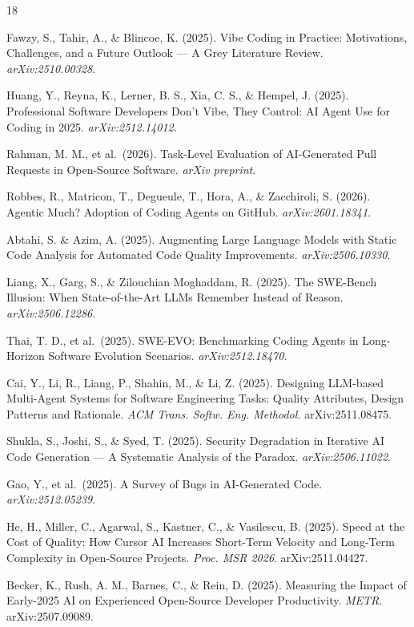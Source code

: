 \documentclass[11pt,a4paper]{article}
\begin{document}
\begin{thebibliography}{18}

 Fawzy, S., Tahir, A., \& Blincoe, K. (2025). Vibe Coding in Practice: Motivations, Challenges, and a Future Outlook --- A Grey Literature Review. \emph{arXiv:2510.00328}.

 Huang, Y., Reyna, K., Lerner, B. S., Xia, C. S., \& Hempel, J. (2025). Professional Software Developers Don't Vibe, They Control: AI Agent Use for Coding in 2025. \emph{arXiv:2512.14012}.

 Rahman, M. M., et al.~(2026). Task-Level Evaluation of AI-Generated Pull Requests in Open-Source Software. \emph{arXiv preprint}.

 Robbes, R., Matricon, T., Degueule, T., Hora, A., \& Zacchiroli, S. (2026). Agentic Much? Adoption of Coding Agents on GitHub. \emph{arXiv:2601.18341}.

 Abtahi, S. \& Azim, A. (2025). Augmenting Large Language Models with Static Code Analysis for Automated Code Quality Improvements. \emph{arXiv:2506.10330}.

 Liang, X., Garg, S., \& Zilouchian Moghaddam, R. (2025). The SWE-Bench Illusion: When State-of-the-Art LLMs Remember Instead of Reason. \emph{arXiv:2506.12286}.

 Thai, T. D., et al.~(2025). SWE-EVO: Benchmarking Coding Agents in Long-Horizon Software Evolution Scenarios. \emph{arXiv:2512.18470}.

 Cai, Y., Li, R., Liang, P., Shahin, M., \& Li, Z. (2025). Designing LLM-based Multi-Agent Systems for Software Engineering Tasks: Quality Attributes, Design Patterns and Rationale. \emph{ACM Trans. Softw. Eng. Methodol.} arXiv:2511.08475.

 Shukla, S., Joshi, S., \& Syed, T. (2025). Security Degradation in Iterative AI Code Generation --- A Systematic Analysis of the Paradox. \emph{arXiv:2506.11022}.

 Gao, Y., et al.~(2025). A Survey of Bugs in AI-Generated Code. \emph{arXiv:2512.05239}.

 He, H., Miller, C., Agarwal, S., Kastner, C., \& Vasilescu, B. (2025). Speed at the Cost of Quality: How Cursor AI Increases Short-Term Velocity and Long-Term Complexity in Open-Source Projects. \emph{Proc. MSR 2026}. arXiv:2511.04427.

 Becker, K., Rush, A. M., Barnes, C., \& Rein, D. (2025). Measuring the Impact of Early-2025 AI on Experienced Open-Source Developer Productivity. \emph{METR}. arXiv:2507.09089.


\end{thebibliography}
\end{document}

